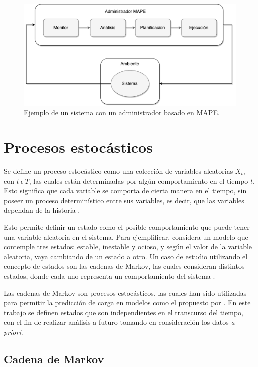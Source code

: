 \begin{figure}[!ht]
	\centering
	\includegraphics[scale=0.55]{images/MAPE.pdf}
	\caption{Ejemplo de un sistema con un administrador basado en MAPE.}
	\label{fig:mape}
\end{figure}

\section{Procesos estocásticos}
\label{sec:procesosEstocasticos}

Se define un proceso estocástico como una colección de variables aleatorias {$X_t$, con $t ~ \epsilon ~ T$}, las cuales están determinadas por algún comportamiento en el tiempo $t$. Esto significa que cada variable se comporta de cierta manera en el tiempo, sin poseer un proceso determinístico entre sus variables, es decir, que las variables dependan de la historia \citep{taylor2014introduction}.

Esto permite definir un estado como el posible comportamiento que puede tener una variable aleatoria en el sistema. Para ejemplificar, considera un modelo que contemple tres estados: estable, inestable y ocioso, y según el valor de la variable aleatoria, vaya cambiando de un estado a otro. Un caso de estudio utilizando el concepto de estados son las cadenas de Markov, las cuales consideran distintos estados, donde cada uno representa un comportamiento del sistema \citep{de1978calculus}.

Las cadenas de Markov son procesos estocásticos, las cuales han sido utilizadas para permitir la predicción de carga en modelos como el propuesto por \citep{GongGW10}. En este trabajo se definen estados que son independientes en el transcurso del tiempo, con el fin de realizar análisis a futuro tomando en consideración los datos \textit{a priori}.

\subsection{Cadena de Markov}
\label{subsec:cadenaMarkov}

